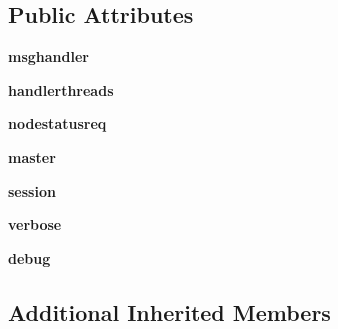 \subsection*{Public Attributes}
\begin{DoxyCompactItemize}
\item 
\hypertarget{classcore_1_1coreserver_1_1_base_aux_request_handler_a1dfec85bd6524a544048c5ab769b6a97}{{\bfseries msghandler}}\label{classcore_1_1coreserver_1_1_base_aux_request_handler_a1dfec85bd6524a544048c5ab769b6a97}

\item 
\hypertarget{classcore_1_1coreserver_1_1_base_aux_request_handler_a35e3510ca160b2d9d79609d74bf07a03}{{\bfseries handlerthreads}}\label{classcore_1_1coreserver_1_1_base_aux_request_handler_a35e3510ca160b2d9d79609d74bf07a03}

\item 
\hypertarget{classcore_1_1coreserver_1_1_base_aux_request_handler_aadb160941328111cc3af992c1238d2df}{{\bfseries nodestatusreq}}\label{classcore_1_1coreserver_1_1_base_aux_request_handler_aadb160941328111cc3af992c1238d2df}

\item 
\hypertarget{classcore_1_1coreserver_1_1_base_aux_request_handler_aadc370284a7b37032296cbbdca65888f}{{\bfseries master}}\label{classcore_1_1coreserver_1_1_base_aux_request_handler_aadc370284a7b37032296cbbdca65888f}

\item 
\hypertarget{classcore_1_1coreserver_1_1_base_aux_request_handler_a4b3e2889de14a30933dc0e18912ed65b}{{\bfseries session}}\label{classcore_1_1coreserver_1_1_base_aux_request_handler_a4b3e2889de14a30933dc0e18912ed65b}

\item 
\hypertarget{classcore_1_1coreserver_1_1_base_aux_request_handler_afd1d0dc58bc0dd476cbcef57f3cc71fd}{{\bfseries verbose}}\label{classcore_1_1coreserver_1_1_base_aux_request_handler_afd1d0dc58bc0dd476cbcef57f3cc71fd}

\item 
\hypertarget{classcore_1_1coreserver_1_1_base_aux_request_handler_a38338fa3388a26917348171d8248045b}{{\bfseries debug}}\label{classcore_1_1coreserver_1_1_base_aux_request_handler_a38338fa3388a26917348171d8248045b}

\end{DoxyCompactItemize}
\subsection*{Additional Inherited Members}


